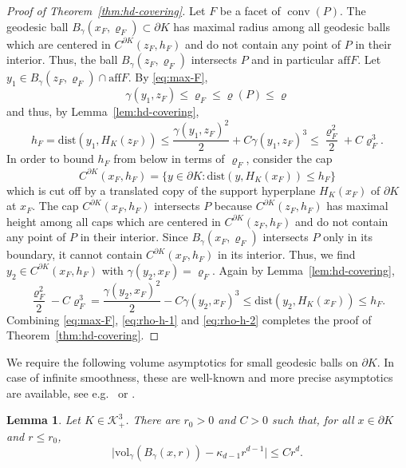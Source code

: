\documentclass[a4paper,12pt,reqno]{amsart}
\newtheorem{lem}[thm]{Lemma}
\theoremstyle{definition}
\newcommand{\cK}{\mathcal{K}}
\newcommand{\vol}{\mathrm{vol}}
\newcommand{\dist}{\mathrm{dist}}
\DeclareMathOperator{\conv}{conv}
\newcommand{\aff}{\mathrm{aff}}
\begin{document}
\begin{proof}[Proof of Theorem~\ref{thm:hd-covering}]
Let $F$ be a facet of $\conv(P)$. The geodesic ball $B_{\gamma}(x_F,\varrho_F)\subset \partial K$ has maximal radius among all geodesic balls which are centered in $C^{\partial K}(z_F,h_F)$ and do not contain any point of $P$ in their interior. Thus, the ball $B_{\gamma}(z_F,\varrho_F)$ intersects $P$ and in particular $\aff F$. Let $y_1\in B_{\gamma}(z_F,\varrho_F)\cap \aff F$.
By \eqref{eq:max-F},
\[
\gamma(y_1,z_F)\le \varrho_F\le \varrho(P)\le \varrho
\]
and thus, by Lemma~\ref{lem:hd-covering}, 
\begin{equation} \label{eq:rho-h-1}
h_F
=\dist(y_1,H_K(z_F))
\le \frac{\gamma(y_1,z_F)^2}{2}+C\gamma(y_1,z_F)^3
\le \frac{\varrho_F^2}{2}+C\varrho_F^3.
\end{equation}
In order to bound $h_F$ from below in terms of $\varrho_F$, consider the cap
\[
C^{\partial K}(x_F,h_F)
=\{y\in \partial K\colon \dist(y,H_K(x_F))\le h_F\}
\]
which is cut off by a translated copy of the support hyperplane $H_K(x_F)$ of $\partial K$ at $x_F$.
The cap $C^{\partial K}(x_F,h_F)$ intersects $P$ because $C^{\partial K}(z_F,h_F)$ has maximal height among all caps which are centered in $C^{\partial K}(z_F,h_F)$ and do not contain any point of $P$ in their interior. Since $B_{\gamma}(x_F,\varrho_F)$ intersects $P$ only in its boundary, it cannot contain $C^{\partial K}(x_F,h_F)$ in its interior. Thus, we find $y_2\in C^{\partial K}(x_F,h_F)$ with $\gamma(y_2,x_F)=\varrho_F$. Again by Lemma~\ref{lem:hd-covering},
\begin{equation} \label{eq:rho-h-2}
\frac{\varrho_F^2}{2}-C\varrho_F^3
=\frac{\gamma(y_2,x_F)^2}{2}-C\gamma(y_2,x_F)^3
\le \dist(y_2,H_K(x_F))
\le h_F.
\end{equation}
Combining \eqref{eq:max-F}, \eqref{eq:rho-h-1} and \eqref{eq:rho-h-2} completes the proof of Theorem~\ref{thm:hd-covering}.
\end{proof}

We require the following volume asymptotics for small geodesic balls on $\partial K$.  In case of infinite smoothness, these are well-known and more precise asymptotics are available, see e.g.~\cite[Theorem~3.1]{Gra74} or \cite[Lem.~2.3]{CCN21}. 

\begin{lem}\label{lem:vol-geo}
Let $K\in \cK^3_+$. There are $r_0>0$ and $C>0$ such that, for all $x\in \partial K$ and $r\le r_0$,
\begin{equation*} 
\big|\vol_{\gamma}(B_{\gamma}(x,r))-\kappa_{d-1} r^{d-1}\big|
\le Cr^d.
\end{equation*}
\end{lem}
\end{document}
